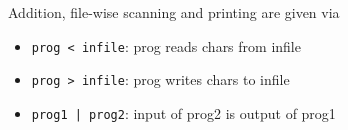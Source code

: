 \documentclass{tufte-book}
\begin{document}
\begin{fullwidth}
\bigskip
Addition, file-wise scanning and printing are given via
\begin{itemize}
    \item \lstinline{prog < infile}: prog reads chars from infile
    \item \lstinline{prog > infile}: prog writes chars to infile
    \item \lstinline{prog1 | prog2}: input of prog2 is output of prog1
\end{itemize}

\end{fullwidth}
\end{document}
